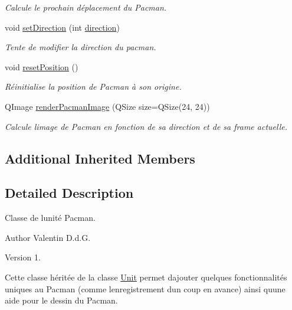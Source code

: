 \begin{DoxyCompactItemize}
\begin{DoxyCompactList}\small\item\em Calcule le prochain déplacement du Pacman. \end{DoxyCompactList}\item 
void \hyperlink{class_pacman_unit_a40f1adb4bd0a91b8bef0fb73bd64fb33}{set\+Direction} (int \hyperlink{class_unit_a5d8a5a789acfa4d2502b0c1082876172}{direction})
\begin{DoxyCompactList}\small\item\em Tente de modifier la direction du pacman. \end{DoxyCompactList}\item 
\hypertarget{class_pacman_unit_aedfa1c220c161792b887a5ab75efcaac}{}void \hyperlink{class_pacman_unit_aedfa1c220c161792b887a5ab75efcaac}{reset\+Position} ()\label{class_pacman_unit_aedfa1c220c161792b887a5ab75efcaac}

\begin{DoxyCompactList}\small\item\em Réinitialise la position de Pacman à son origine. \end{DoxyCompactList}\item 
Q\+Image \hyperlink{class_pacman_unit_a602006dba49b71a1b0c75787440b4ea0}{render\+Pacman\+Image} (Q\+Size size=Q\+Size(24, 24))
\begin{DoxyCompactList}\small\item\em Calcule l\textquotesingle{}image de Pacman en fonction de sa direction et de sa frame actuelle. \end{DoxyCompactList}\end{DoxyCompactItemize}
\subsection*{Additional Inherited Members}


\subsection{Detailed Description}
Classe de l\textquotesingle{}unité Pacman. 

\begin{DoxyAuthor}{Author}
Valentin D.\+d.\+G. 
\end{DoxyAuthor}
\begin{DoxyVersion}{Version}
1.
\end{DoxyVersion}
Cette classe héritée de la classe \hyperlink{class_unit}{Unit} permet d\textquotesingle{}ajouter quelques fonctionnalités uniques au Pacman (comme l\textquotesingle{}enregistrement d\textquotesingle{}un coup en avance) ainsi qu\textquotesingle{}une aide pour le dessin du Pacman. 

